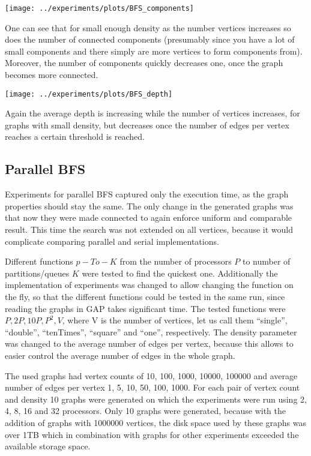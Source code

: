 \documentclass{report}
\theoremstyle{plain}
\theoremstyle{definition}
\theoremstyle{remark}
\begin{document}
\texttt{[image: ../experiments/plots/BFS\_components]}

One can see that for small enough density as the number vertices increases so does the number of connected components (presumably since you have a lot of small components and there simply are more vertices to form components from). Moreover, the number of components quickly decreases one, once the graph becomes more connected. 

\texttt{[image: ../experiments/plots/BFS\_depth]}

Again the average depth is increasing while the number of vertices increases, for graphs with small density, but decreases once the number of edges per vertex reaches a certain threshold is reached.

\subsection{Parallel BFS}

Experiments for parallel BFS captured only the execution time, as the graph properties should stay the same. The only change in the generated graphs was that now they were made connected to again enforce uniform and comparable result. This time the search was not extended on all vertices, because it would complicate comparing parallel and serial implementations. 

Different functions $p-To-K$ from the number of processors $P$ to number of partitions/queues $K$ were tested to find the quickest one. Additionally the implementation of experiments was changed to allow changing the function on the fly, so that the different functions could be tested in the same run, since reading the graphs in GAP takes significant time. The tested functions were $P, 2P, 10P, P^2, V$, where V is the number of vertices, let us call them ``single'', ``double'', ``tenTimes'', ``square'' and ``one'', respectively. The density parameter was changed to the average number of edges per vertex, because this allows to easier control the average number of edges in the whole graph.

The used graphs had vertex counts of 10, 100, 1000, 10000, 100000 and average number of edges per vertex 1, 5, 10, 50, 100, 1000. For each pair of vertex count and density 10 graphs were generated on which the experiments were run using 2, 4, 8, 16 and 32 processors. Only 10 graphs were generated, because with the addition of graphs with 1000000 vertices, the disk space used by these graphs was over 1TB which in combination with graphs for other experiments exceeded the available storage space.
\end{document}
